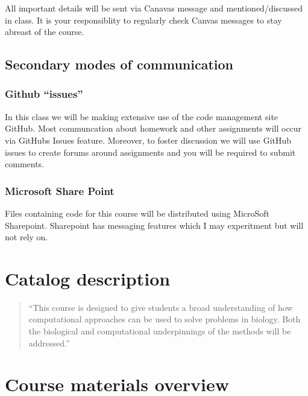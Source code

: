 \documentclass[
]{book}
\begin{document}
All important details will be sent via Canavas message and mentioned/discussed in class. It is your responsiblity to regularly check Canvas messages to stay abreast of the course.

\hypertarget{secondary-modes-of-communication}{%
\section{Secondary modes of communication}\label{secondary-modes-of-communication}}

\hypertarget{github-issues}{%
\subsection{Github ``issues''}\label{github-issues}}

In this class we will be making extensive use of the code management site GitHub. Most communcation about homework and other assignments will occur via GitHubs Issues feature. Moreover, to foster discussion we will use GitHub issues to create forums around assignments and you will be required to submit comments.

\hypertarget{microsoft-share-point}{%
\subsection{Microsoft Share Point}\label{microsoft-share-point}}

Files containing code for this course will be distributed using MicroSoft Sharepoint. Sharepoint has messaging features which I may experitment but will not rely on.

\hypertarget{catalog-description}{%
\chapter{Catalog description}\label{catalog-description}}

\begin{quote}
``This course is designed to give students a broad understanding of how computational approaches can be used to solve problems in biology. Both the biological and computational underpinnings of the methods will be addressed.''
\end{quote}

\hypertarget{course-materials-overview}{%
\chapter{Course materials overview}\label{course-materials-overview}}
\end{document}
